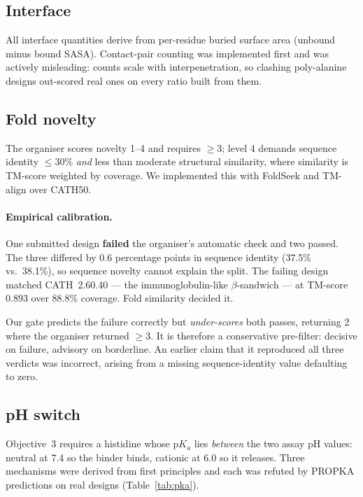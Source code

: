 \documentclass[11pt,a4paper]{article}
\begin{document}
\subsection{Interface}
All interface quantities derive from per-residue buried surface area (unbound minus bound
SASA). Contact-pair counting was implemented first and was actively misleading: counts scale
with interpenetration, so clashing poly-alanine designs out-scored real ones on every ratio
built from them.

\subsection{Fold novelty}
The organiser scores novelty 1--4 and requires $\geq 3$; level 4 demands sequence identity
$\leq 30\%$ \emph{and} less than moderate structural similarity, where similarity is TM-score
weighted by coverage. We implemented this with FoldSeek and TM-align over CATH50.

\paragraph{Empirical calibration.} One submitted design \textbf{failed} the organiser's
automatic check and two passed. The three differed by $0.6$ percentage points in sequence
identity (37.5\% vs.\ 38.1\%), so sequence novelty cannot explain the split. The failing design
matched CATH~2.60.40 --- the immunoglobulin-like $\beta$-sandwich --- at TM-score $0.893$ over
88.8\% coverage. Fold similarity decided it.

Our gate predicts the failure correctly but \emph{under-scores} both passes, returning 2 where
the organiser returned $\geq 3$. It is therefore a conservative pre-filter: decisive on
failure, advisory on borderline. An earlier claim that it reproduced all three verdicts was
incorrect, arising from a missing sequence-identity value defaulting to zero.

\subsection{pH switch}
Objective~3 requires a histidine whose p$K_a$ lies \emph{between} the two assay pH values:
neutral at 7.4 so the binder binds, cationic at 6.0 so it releases. Three mechanisms were
derived from first principles and each was refuted by PROPKA predictions on real designs
(Table~\ref{tab:pka}).
\end{document}
